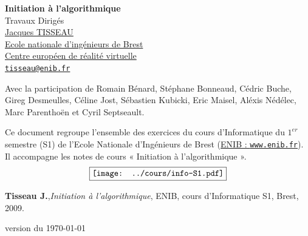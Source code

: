 \documentclass[11pt,a4paper,colorlinks,breaklinks]{book}
\theoremstyle{mybreak}
\begin{document}

\begin{titlepage}
\thispagestyle{fancy}
\setlength{\headheight}{79pt}
\setlength{\footskip}{20pt}
\renewcommand{\headrulewidth}{0pt}
\renewcommand{\footrulewidth}{0pt}

\begin{center}
{\huge\bf Initiation à l'algorithmique}\\[5mm]
{\huge\sc Travaux Dirigés}\\[1cm]
\href{http://www.enib.fr/~tisseau}{\Large\sc Jacques TISSEAU}\\[3mm]
\href{http://www.enib.fr}{Ecole nationale d'ingénieurs de Brest}\\
\href{http://www.cerv.fr}{Centre européen de réalité virtuelle}\\
\href{mailto:tisseau@enib.fr}{\tt tisseau@enib.fr}
\end{center}

{\footnotesize\vspace*{1.5mm}
\noindent Avec la participation de 
{\sc Romain Bénard}, 
{\sc Stéphane Bonneaud}, {\sc Cédric Buche},
{\sc Gireg Desmeulles}, {\sc Céline Jost}, 
{\sc Sébastien Kubicki}, {\sc Eric Maisel}, 
{\sc Aléxis Nédélec}, {\sc Marc Parenthoën} et 
{\sc Cyril Septseault}.
}
\vspace*{1cm}

\noindent Ce document regroupe l'ensemble des exercices du cours d'Informatique 
du $1^{er}$ semestre (S1) de l'Ecole Nationale d'Ingénieurs 
de Brest (\href{http://www.enib.fr}{ENIB : {\tt www.enib.fr}}). Il
accompagne les notes de cours « Initiation à l'algorithmique ».
$$\fbox{\texttt{[image: ../cours/info-S1.pdf]}}$$
\centerline{\footnotesize
{\bf Tisseau J.},{\em Initiation à l'algorithmique}, ENIB, cours d'Informatique S1, Brest, 2009.
}
\null\vfill

\centerline{\tiny version du \today}
\end{titlepage}
\end{document}
